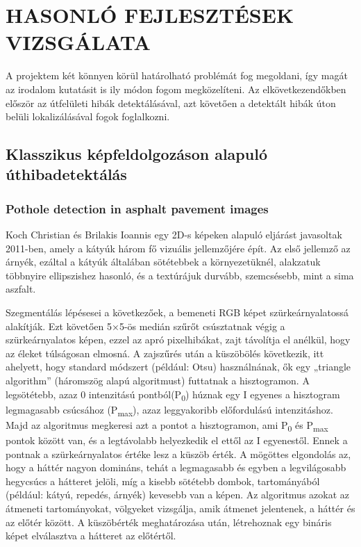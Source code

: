 \section{HASONLÓ FEJLESZTÉSEK VIZSGÁLATA}

A projektem két könnyen körül határolható problémát fog megoldani, így
magát az irodalom kutatásit is ily módon fogom megközelíteni. Az
elkövetkezendőkben először az útfelületi hibák detektálásával, azt
követően a detektált hibák úton belüli lokalizálásával fogok foglalkozni.

\subsection{Klasszikus képfeldolgozáson alapuló úthibadetektálás}
\label{klasszikus-kepfeldolgozason-alapulo-uthibadetektálas}

\subsubsection{Pothole detection in asphalt pavement images}
\label{pothole-detection-in-asphalt-pavement-images}

Koch Christian és Brilakis Ioannis egy 2D-s képeken alapuló eljárást
javasoltak 2011-ben, amely a kátyúk három fő vizuális jellemzőjére épít.
Az első jellemző az árnyék, ezáltal a kátyúk általában sötétebbek a
környezetüknél, alakzatuk többnyire ellipszishez hasonló, és a
textúrájuk durvább, szemcsésebb, mint a sima aszfalt.

Szegmentálás lépésesei a következőek, a bemeneti RGB képet
szürkeárnyalatossá alakítják. Ezt követően 5×5-ös medián szűrőt
csúsztatnak végig a szürkeárnyalatos képen, ezzel az apró pixelhibákat,
zajt távolítja el anélkül, hogy az éleket túlságosan elmosná. A
zajszűrés után a küszöbölés következik, itt ahelyett, hogy standard
módszert (például: Otsu) használnának, ők egy „triangle algorithm''
(háromszög alapú algoritmust) futtatnak a hisztogramon. A legsötétebb,
azaz 0 intenzitású pontból(P\textsubscript{0}) húznak egy I egyenes a
hisztogram legmagasabb csúcsához (P\textsubscript{max}), azaz
leggyakoribb előfordulású intenzitáshoz. Majd az algoritmus megkeresi
azt a pontot a hisztogramon, ami P\textsubscript{0} és
P\textsubscript{max} pontok között van, és a legtávolabb helyezkedik el
ettől az I egyenestől. Ennek a pontnak a szürkeárnyalatos értéke lesz a
küszöb érték. A mögöttes elgondolás az, hogy a háttér nagyon domináns,
tehát a legmagasabb és egyben a legvilágosabb hegycsúcs a hátteret
jelöli, míg a kisebb sötétebb dombok, tartományából (például: kátyú,
repedés, árnyék) kevesebb van a képen. Az algoritmus azokat az átmeneti
tartományokat, völgyeket vizsgálja, amik átmenet jelentenek, a háttér és
az előtér között. A küszöbérték meghatározása után, létrehoznak egy
bináris képet elválasztva a hátteret az előtértől.


